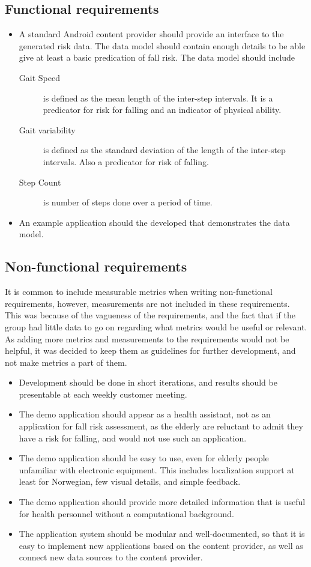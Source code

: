 \subsection{Functional requirements}
\begin{itemize}
\item A standard Android content provider should provide an interface to the generated risk data. The data model should contain enough details to be able give at least a basic predication of fall risk. The data model should include 
\begin{description}
\item[Gait Speed] \label{def:gaitSpeed}is defined as the mean length of the inter-step intervals. It is a predicator for risk for falling and an indicator of physical ability.
\item[Gait variability] \label{def:gaitVariability}is defined as the standard deviation of the length of the inter-step intervals. Also a predicator for risk of falling.
\item[Step Count] \label{def:stepCount}is number of steps done over a period of time. 
\end{description}
\item An example application should the developed that demonstrates the data model.
\end{itemize}	

\subsection{Non-functional requirements}
It is common to include measurable metrics when writing non-functional requirements, however, measurements are not included in these requirements. This was because of the vagueness of the requirements, and the fact that if the group had little data to go on regarding what metrics would be useful or relevant. As adding more metrics and measurements to the requirements would not be helpful, it was decided to keep them as guidelines for further development, and not make metrics a part of them.
\begin{itemize}
\item Development should be done in short iterations, and results should be presentable at each weekly customer meeting.
\item The demo application should appear as a health assistant, not as an application for fall risk assessment, as the elderly are reluctant to admit they have a risk for falling, and would not use such an application.
\item The demo application should be easy to use, even for elderly people unfamiliar with electronic equipment. This includes localization support at least for Norwegian, few visual details, and simple feedback.
\item The demo application should provide more detailed information that is useful for health personnel without a computational background.
\item The application system should be modular and well-documented, so that it is easy to implement new applications based on the content provider, as well as connect new data sources to the content provider.
\end{itemize}


